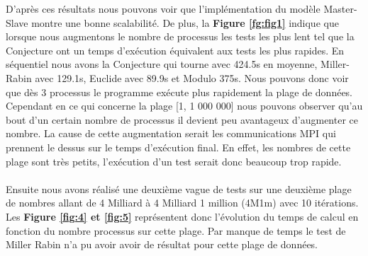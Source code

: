 D'après ces résultats nous pouvons voir que l'implémentation du modèle Master-Slave montre une bonne scalabilité. De plus, la \textbf{Figure \ref{fg:fig1}} indique que lorsque nous augmentons le nombre de processus les tests les plus lent tel que la Conjecture ont un temps d'exécution équivalent aux tests les plus rapides. En séquentiel nous avons la Conjecture qui tourne avec 424.5s en moyenne, Miller-Rabin avec 129.1s, Euclide avec 89.9s et Modulo 375s. Nous pouvons donc voir que dès 3 processus le programme exécute plus rapidement la plage de données.
Cependant en ce qui concerne la plage [1, 1 000 000] nous pouvons observer qu'au bout d'un certain nombre de processus il devient peu avantageux d'augmenter ce nombre. La cause de cette augmentation serait les communications MPI qui prennent le dessus sur le temps d'exécution final. En effet, les nombres de cette plage sont très petits, l'exécution d'un test serait donc beaucoup trop rapide.\\


	\paragraph{}Ensuite nous avons réalisé une deuxième vague de tests sur une deuxième plage de nombres allant de 4 Milliard à 4 Milliard 1 million (4M1m) avec 10 itérations. Les \textbf{Figure \ref{fig:4} et \ref{fig:5}} représentent donc l'évolution du temps de calcul en fonction du nombre processus sur cette plage. Par manque de temps le test de Miller Rabin n'a pu avoir avoir de résultat pour cette plage de données.

